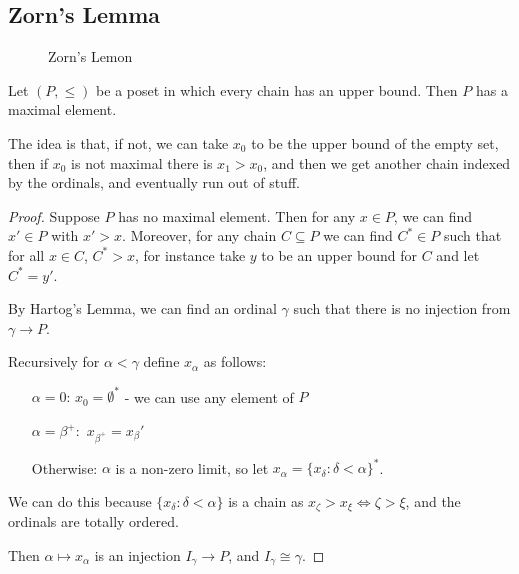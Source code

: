 \documentclass[10pt,a4paper]{article}
\begin{document}
\subsection{Zorn's Lemma}
\begin{figure}[H]
\centering
{}
\caption{Zorn's Lemon}
\end{figure}
\begin{theorem}
Let $(P, \leq)$ be a poset in which every chain has an upper bound. Then $P$ has a maximal element.
\end{theorem}
The idea is that, if not, we can take $x_0$ to be the upper bound of the empty set, then if $x_0$ is not maximal there is $x_1 > x_0$, and then we get another chain indexed by the ordinals, and eventually run out of stuff.
\begin{proof}
Suppose $P$ has no maximal element. Then for any $x \in P$, we can find $x' \in P$ with $x' > x$. Moreover, for any chain $C \subseteq P$ we can find $C^{\ast} \in P$ such that for all $x \in C$, $C^{\ast} > x$, for instance take $y$ to be an upper bound for $C$ and let $C^{\ast} = y'$.

By Hartog's Lemma, we can find an ordinal $\gamma$ such that there is no injection from $\gamma \to P$.

Recursively for $\alpha < \gamma$ define $x_{\alpha}$ as follows:
\begin{itemize}
\item[$\alpha=0$:] $x_0 = \emptyset^{\ast}$ - we can use any element of $P$
\item[$\alpha=\beta^+:$] $x_{\beta^+} = x_{\beta}'$
\item[Otherwise:] $\alpha$ is a non-zero limit, so let $x_{\alpha} = \{x_{\delta} : \delta < \alpha\}^{\ast}$.
\end{itemize}
We can do this because $\{x_\delta : \delta < \alpha\}$ is a chain as $x_{\zeta} > x_{\xi} \iff \zeta > \xi$, and the ordinals are totally ordered.

Then $\alpha \mapsto x_{\alpha}$ is an injection $I_\gamma \to P$, and $I_\gamma \cong \gamma$. \contr
\end{proof}
\end{document}
